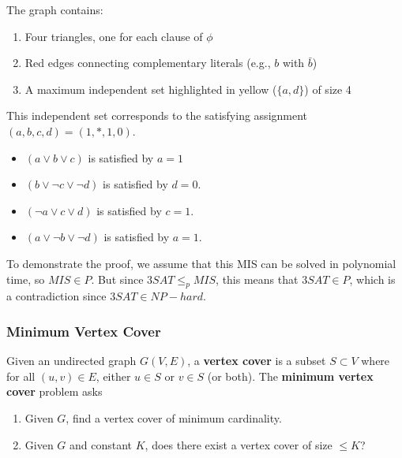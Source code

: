 \begin{example}
      The graph contains:
      \begin{enumerate}
        \item Four triangles, one for each clause of $\phi$
        \item Red edges connecting complementary literals (e.g., $b$ with $\bar{b}$)
        \item A maximum independent set highlighted in yellow ($\{a, d\}$) of size 4
      \end{enumerate} 

      This independent set corresponds to the satisfying assignment $(a, b, c, d) = (1, \ast, 1, 0)$. 
      \begin{itemize}
        \item $(a \lor b \lor c)$ is satisfied by $a = 1$
        \item $(b \lor \neg c \lor \neg d)$ is satisfied by $d = 0$. 
        \item $(\neg a \lor c \lor d)$ is satisfied by $c = 1$. 
        \item $(a \lor \neg b \lor \neg d)$ is satisfied by $a = 1$. 
      \end{itemize}

      To demonstrate the proof, we assume that this MIS can be solved in polynomial time, so $MIS \in P$. But since $3SAT \leq_p MIS$, this means that $3SAT \in P$, which is a contradiction since $3SAT \in NP-hard$. 
    \end{example} 

  \subsubsection{Minimum Vertex Cover}

    \begin{definition}
      Given an undirected graph $G(V, E)$, a \textbf{vertex cover} is a subset $S \subset V$ where for all $(u, v) \in E$, either $u \in S$ or $v \in S$ (or both). The \textbf{minimum vertex cover} problem asks 
      \begin{enumerate}
        \item Given $G$, find a vertex cover of minimum cardinality. 
        \item Given $G$ and constant $K$, does there exist a vertex cover of size $\leq K$? 
      \end{enumerate}
    \end{definition}

